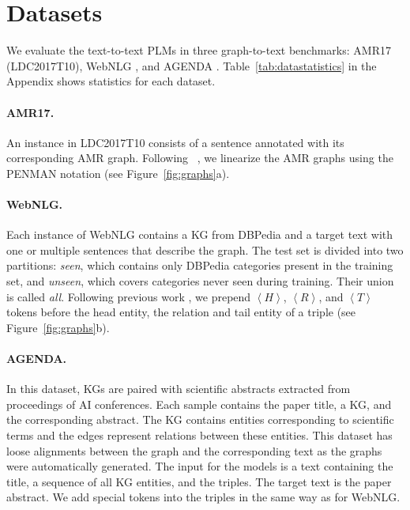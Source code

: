 \documentclass[11pt,a4paper]{article}
\newcommand{\ourtag}[1]{\ensuremath{\left\langle #1 \right\rangle}}
\begin{document}
\section{Datasets}
\label{sec:data}

We evaluate the text-to-text PLMs in three graph-to-text benchmarks: AMR17 (LDC2017T10), WebNLG \cite{gardent-etal-2017-webnlg}, and AGENDA \cite{koncel-kedziorski-etal-2019-text}. Table~\ref{tab:datastatistics} in the Appendix shows statistics for each dataset.



\paragraph{AMR17.} An instance in LDC2017T10 consists of a sentence annotated with its corresponding AMR graph. Following ~\citet{mager2020gpttoo}, we linearize the AMR graphs using the PENMAN notation (see Figure~\ref{fig:graphs}a).






\paragraph{WebNLG.} Each instance of WebNLG contains a KG from DBPedia \cite{10.5555/1785162.1785216} and a target text with one or multiple sentences that describe the graph. The test set is divided into two partitions: \textit{seen}, which contains only DBPedia categories present in the training set, and \textit{unseen}, which covers categories never seen during training. Their union is called \textit{all}.
Following previous work \cite{harkous2020text}, we prepend \ourtag{H}, \ourtag{R}, and \ourtag{T} tokens before the head entity, the relation and tail entity of a triple (see Figure~\ref{fig:graphs}b).

\paragraph{AGENDA.} In this dataset, KGs are paired with scientific abstracts extracted from proceedings of AI conferences. Each sample contains the paper title, a KG, and the corresponding abstract. The KG contains entities corresponding to scientific terms and the edges represent relations between these entities. This dataset has loose alignments between the graph and the corresponding text as the graphs were automatically generated. The input for the models is a text containing the title, a sequence of all KG entities, and the triples. The target text is the paper abstract. We add special tokens into the triples in the same way as for WebNLG. 
\end{document}
